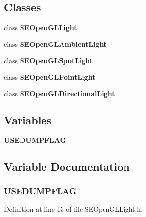 \subsection*{Classes}
\begin{DoxyCompactItemize}
\item 
class {\bf S\+E\+Open\+G\+L\+Light}
\item 
class {\bf S\+E\+Open\+G\+L\+Ambient\+Light}
\item 
class {\bf S\+E\+Open\+G\+L\+Spot\+Light}
\item 
class {\bf S\+E\+Open\+G\+L\+Point\+Light}
\item 
class {\bf S\+E\+Open\+G\+L\+Directional\+Light}
\end{DoxyCompactItemize}
\subsection*{Variables}
\begin{DoxyCompactItemize}
\item 
{\bf U\+S\+E\+D\+U\+M\+P\+F\+L\+A\+G}
\end{DoxyCompactItemize}


\subsection{Variable Documentation}
\subsubsection[{U\+S\+E\+D\+U\+M\+P\+F\+L\+A\+G}]{\setlength{\rightskip}{0pt plus 5cm}U\+S\+E\+D\+U\+M\+P\+F\+L\+A\+G}\label{_s_e_open_g_l_light_8h_adf706a38197b60bc3bf6b16557554414}


Definition at line 13 of file S\+E\+Open\+G\+L\+Light.\+h.

